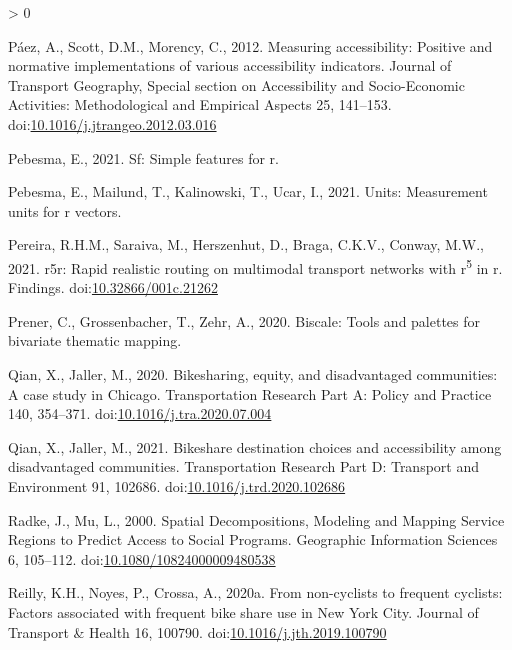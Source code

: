 \documentclass[]{elsarticle} %
\newlength{\cslhangindent}
\newenvironment{CSLReferences}[2] %
 {%
  \setlength{\parindent}{0pt}
  \ifodd #1 \everypar{\setlength{\hangindent}{\cslhangindent}}\ignorespaces\fi
  \ifnum #2 > 0
  \setlength{\parskip}{#2\baselineskip}
  \fi
 }%
 {}
\begin{document}
\begin{CSLReferences}{1}{0}
\leavevmode\hypertarget{ref-paezMeasuringAccessibilityPositive2012}{}%
Páez, A., Scott, D.M., Morency, C., 2012. Measuring accessibility:
Positive and normative implementations of various accessibility
indicators. Journal of Transport Geography, Special {section} on
{Accessibility} and {Socio}-{Economic Activities}: {Methodological} and
{Empirical Aspects} 25, 141--153.
doi:\href{https://doi.org/10.1016/j.jtrangeo.2012.03.016}{10.1016/j.jtrangeo.2012.03.016}

\leavevmode\hypertarget{ref-R-sf}{}%
Pebesma, E., 2021. Sf: Simple features for r.

\leavevmode\hypertarget{ref-R-units}{}%
Pebesma, E., Mailund, T., Kalinowski, T., Ucar, I., 2021. Units:
Measurement units for r vectors.

\leavevmode\hypertarget{ref-Pereira2021r5r}{}%
Pereira, R.H.M., Saraiva, M., Herszenhut, D., Braga, C.K.V., Conway,
M.W., 2021. r5r: Rapid realistic routing on multimodal transport
networks with r\textsuperscript{5} in r. Findings.
doi:\href{https://doi.org/10.32866/001c.21262}{10.32866/001c.21262}

\leavevmode\hypertarget{ref-R-biscale}{}%
Prener, C., Grossenbacher, T., Zehr, A., 2020. Biscale: Tools and
palettes for bivariate thematic mapping.

\leavevmode\hypertarget{ref-qianBikesharingEquityDisadvantaged2020}{}%
Qian, X., Jaller, M., 2020. Bikesharing, equity, and disadvantaged
communities: {A} case study in {Chicago}. Transportation Research Part
A: Policy and Practice 140, 354--371.
doi:\href{https://doi.org/10.1016/j.tra.2020.07.004}{10.1016/j.tra.2020.07.004}

\leavevmode\hypertarget{ref-qianBikeshareDestinationChoices2021}{}%
Qian, X., Jaller, M., 2021. Bikeshare destination choices and
accessibility among disadvantaged communities. Transportation Research
Part D: Transport and Environment 91, 102686.
doi:\href{https://doi.org/10.1016/j.trd.2020.102686}{10.1016/j.trd.2020.102686}

\leavevmode\hypertarget{ref-radkeSpatialDecompositionsModeling2000}{}%
Radke, J., Mu, L., 2000. Spatial {Decompositions}, {Modeling} and
{Mapping Service Regions} to {Predict Access} to {Social Programs}.
Geographic Information Sciences 6, 105--112.
doi:\href{https://doi.org/10.1080/10824000009480538}{10.1080/10824000009480538}

\leavevmode\hypertarget{ref-reillyNoncyclistsFrequentCyclists2020}{}%
Reilly, K.H., Noyes, P., Crossa, A., 2020a. From non-cyclists to
frequent cyclists: {Factors} associated with frequent bike share use in
{New York City}. Journal of Transport \& Health 16, 100790.
doi:\href{https://doi.org/10.1016/j.jth.2019.100790}{10.1016/j.jth.2019.100790}


\end{CSLReferences}
\end{document}
